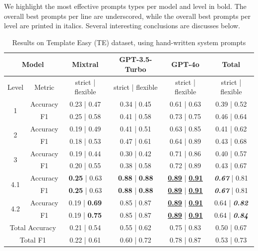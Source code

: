 \documentclass[runningheads]{llncs}
\begin{document}
We highlight the most effective prompts types per model and level in bold. The overall best prompts per line are underscored, while the overall best prompts per level are printed in italics.
Several interesting conclusions are discusses below.

\begin{table}[!tb]
\centering
\caption{Results on Template Easy (TE) dataset, using hand-written system prompts}
\begin{tabular}{cc|c|c|c|c}
\hline \hline
\multicolumn{2}{c|}{Model}  				& Mixtral & GPT-3.5-Turbo & GPT-4o & Total \\
\hline
Level & Metric                      & strict | flexible          & strict | flexible  & strict | flexible & strict | flexible      \\
\hline \hline
\multirow{2}{*}{1}     & Accuracy &	0.23 | 0.47 &	0.34 | 0.45 &	0.61 | 0.63 & 0.39 | 0.52 \\
      & F1	     &  0.25 | 0.58	& 0.41 | 0.58	& 0.73 | 0.75 & 0.46 | 0.64 \\
			\hline
\multirow{2}{*}{2}			& Accuracy &	0.19 | 0.49	& 0.41 | 0.51	& 0.63 | 0.85 & 0.41 | 0.62 \\
		  & F1	     &  0.18 | 0.53	& 0.47 | 0.61	& 0.64 | 0.89 & 0.43 | 0.68 \\
			\hline
\multirow{2}{*}{3}			& Accuracy &  0.19 | 0.44	& 0.30 | 0.42	& 0.71 | 0.86 & 0.40 | 0.57 \\
		  & F1	     &  0.20 | 0.55	& 0.38 | 0.58	& 0.72 | 0.89 & 0.43 | 0.67 \\
			\hline
\multirow{2}{*}{4.1}   & Accuracy & \textbf{0.25} | 0.63	& \textbf{0.88} | \textbf{0.88}	&  \underline{\textbf{0.89}} | \underline{\textbf{0.91}} & \textit{\textbf{0.67}} | 0.81 \\
			   & F1       &	\textbf{0.25} | 0.63	& \textbf{0.88} | \textbf{0.88}	& \underline{\textbf{0.89}} | \underline{\textbf{0.91}} & \textit{\textbf{0.67}} | 0.81 \\
			\hline
\multirow{2}{*}{4.2}   & Accuracy &	0.19 | \textbf{0.69}	& 0.85 | 0.87	& \underline{\textbf{0.89}} | \underline{\textbf{0.91}} & 0.64 | \textit{\textbf{0.82}} \\
				 & F1       &	0.19 | \textbf{0.75}	& 0.85 | 0.87	& \underline{\textbf{0.89}} | \underline{\textbf{0.91}} & 0.64 | \textit{\textbf{0.84}} \\
\hline \hline
\multicolumn{2}{c|}{Total Accuracy}	& 0.21 | 0.54 & 	0.55 | 0.62	& 0.75 | 0.83 & 0.50 | 0.67 \\
\multicolumn{2}{c|}{Total F1}  	      & 0.22 | 0.61	& 0.60 | 0.72	& 0.78 | 0.87 & 0.53 | 0.73 \\
 \hline \hline
\end{tabular}
\label{tbl:TE-handwritten}
\end{table}
\end{document}
